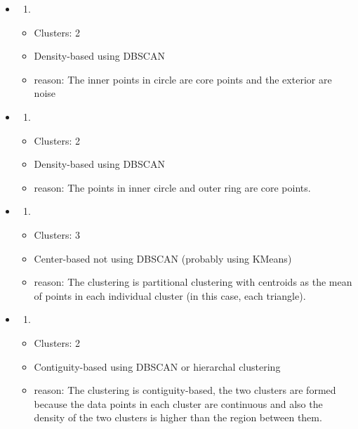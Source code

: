 \documentclass[11pt]{article}
\providecommand{\tightlist}{%
      \setlength{\itemsep}{0pt}\setlength{\parskip}{0pt}}
\begin{document}
    \begin{itemize}
\item
  \begin{enumerate}
  \def\labelenumi{\arabic{enumi}.}
  \item
  \end{enumerate}

  \begin{itemize}
  \tightlist
  \item
    Clusters: 2
  \item
    Density-based using DBSCAN
  \item
    reason: The inner points in circle are core points and the exterior
    are noise
  \end{itemize}
\item
  \begin{enumerate}
  \def\labelenumi{\arabic{enumi}.}
  \setcounter{enumi}{1}
  \item
  \end{enumerate}

  \begin{itemize}
  \tightlist
  \item
    Clusters: 2
  \item
    Density-based using DBSCAN
  \item
    reason: The points in inner  circle and outer ring are core points.
  \end{itemize}
\item
  \begin{enumerate}
  \def\labelenumi{\arabic{enumi}.}
  \setcounter{enumi}{2}
  \item
  \end{enumerate}

  \begin{itemize}
  \tightlist
  \item
    Clusters: 3
  \item
    Center-based not using DBSCAN (probably using KMeans)
  \item
    reason: The clustering is partitional clustering with centroids as the mean of points in each individual cluster (in this case, each triangle).
  \end{itemize}
\item
  \begin{enumerate}
  \def\labelenumi{\arabic{enumi}.}
  \setcounter{enumi}{3}
  \item
  \end{enumerate}

  \begin{itemize}
  \tightlist
  \item
    Clusters: 2
  \item
    Contiguity-based using DBSCAN or hierarchal clustering
  \item
    reason: The clustering is contiguity-based, the two clusters are formed because the data points in each cluster are continuous and also the density of the two clusters is higher than the region between them.
  \end{itemize}
\end{itemize}


    
    
    
    
\end{document}
